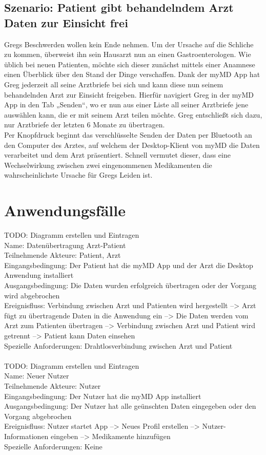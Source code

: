 \documentclass[a4paper]{scrreprt}
\begin{document}
\subsection{Szenario: Patient gibt behandelndem Arzt Daten zur Einsicht frei}
Gregs Beschwerden wollen kein Ende nehmen. Um der Ursache auf die Schliche zu kommen, überweist ihn sein Hausarzt nun an einen Gastroenterologen. Wie üblich bei neuen Patienten, möchte sich dieser zunächst mittels einer Anamnese einen Überblick über den Stand der Dinge verschaffen. Dank der myMD \gls{App} hat Greg jederzeit all seine Arztbriefe bei sich und kann diese nun seinem behandelnden Arzt zur Einsicht freigeben. Hierfür navigiert Greg in der myMD App in den Tab „Senden“, wo er nun aus einer Liste all seiner Arztbriefe jene auswählen kann, die er mit seinem Arzt teilen möchte. Greg entschließt sich dazu, nur Arztbriefe der letzten 6 Monate zu übertragen. \\
Per Knopfdruck beginnt das verschlüsselte Senden der Daten per \gls{Bluetooth} an den Computer des Arztes, auf welchem der Desktop-Klient von myMD die Daten verarbeitet und dem Arzt präsentiert. Schnell vermutet dieser, dass eine Wechselwirkung zwischen zwei eingenommenen Medikamenten die wahrscheinlichste Ursache für Gregs Leiden ist.

\section{Anwendungsfälle}
TODO: Diagramm erstellen und Eintragen \\
Name: Datenübertragung Arzt-Patient \\
Teilnehmende Akteure: Patient, Arzt \\
Eingangsbedingung: Der Patient hat die myMD \gls{App} und der Arzt die \gls{Desktop Anwendung} installiert \\
Ausgangsbedingung: Die Daten wurden erfolgreich übertragen oder der Vorgang wird abgebrochen \\
Ereignisfluss: Verbindung zwischen Arzt und Patienten wird hergestellt --> Arzt fügt zu übertragende Daten in die Anwendung ein --> Die Daten werden vom Arzt zum Patienten übertragen --> Verbindung zwischen Arzt und Patient wird getrennt --> Patient kann Daten einsehen\\
Spezielle Anforderungen: Drahtlosverbindung zwischen Arzt und Patient\\\\
TODO: Diagramm erstellen und Eintragen \\
Name: Neuer Nutzer \\
Teilnehmende Akteure: Nutzer\\
Eingangsbedingung: Der Nutzer hat die myMD \gls{App} installiert \\
Ausgangsbedingung: Der Nutzer hat alle geünschten Daten eingegeben oder den Vorgang abgebrochen\\
Ereignisfluss: Nutzer startet App --> Neues Profil erstellen --> Nutzer-Informationen eingeben -->  Medikamente hinzufügen\\
Spezielle Anforderungen: Keine
\end{document}
